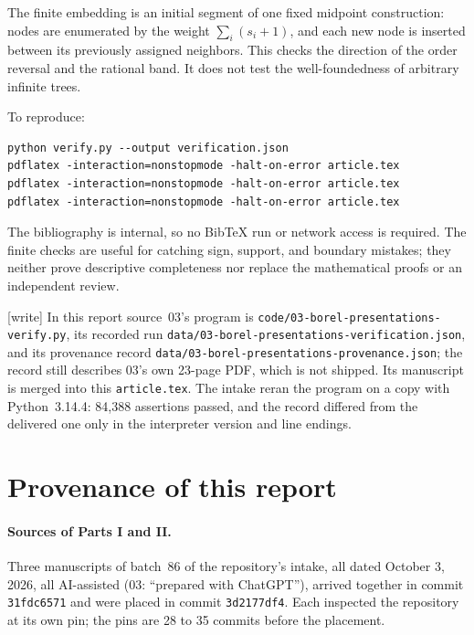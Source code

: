 \documentclass[11pt]{article}
\numberwithin{equation}{section}
\theoremstyle{definition}
\theoremstyle{remark}
\newcommand{\writetag}{\textup{\textsf{\small[write]}}}
\newcommand{\fn}[1]{\nolinkurl{#1}}
\begin{document}
The finite embedding is an initial segment of one fixed midpoint construction:
nodes are enumerated by the weight $\sum_i(s_i+1)$, and each new node is
inserted between its previously assigned neighbors. This checks the direction
of the order reversal and the rational band. It does not test the
well-foundedness of arbitrary infinite trees.

To reproduce:
\begin{verbatim}
python verify.py --output verification.json
pdflatex -interaction=nonstopmode -halt-on-error article.tex
pdflatex -interaction=nonstopmode -halt-on-error article.tex
pdflatex -interaction=nonstopmode -halt-on-error article.tex
\end{verbatim}
The bibliography is internal, so no BibTeX run or network access is required.
The finite checks are useful for catching sign, support, and boundary mistakes;
they neither prove descriptive completeness nor replace the mathematical
proofs or an independent review.

\noindent\writetag{} In this report source~03's program is
\fn{code/03-borel-presentations-verify.py}, its recorded run
\fn{data/03-borel-presentations-verification.json}, and its provenance record
\fn{data/03-borel-presentations-provenance.json}; the record still describes
03's own 23-page PDF, which is not shipped. Its manuscript is merged into this
\fn{article.tex}. The intake reran the program on a copy with Python~3.14.4:
84{,}388 assertions passed, and the record differed from the delivered one only
in the interpreter version and line endings.

\section{Provenance of this report}\label{pma:app:provenance}

\paragraph{Sources of Parts I and II.} Three manuscripts of batch~86 of the repository's
intake, all dated October 3, 2026, all AI-assisted (03: ``prepared with
ChatGPT''), arrived together in commit \texttt{31fdc6571} and were placed in
commit \texttt{3d2177df4}. Each inspected the repository at its own pin; the
pins are 28 to 35 commits before the placement.
\end{document}
